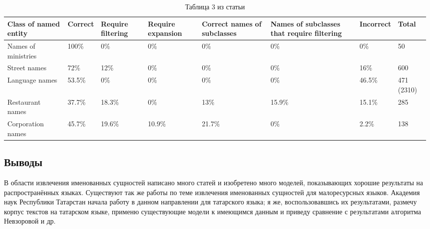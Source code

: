\begin{enumerate}
\end{enumerate}


\begin{table}[h!]
 \begin{tabular}[h]{m{2.2cm}m{1.7cm}m{1.7cm}m{1.8cm}m{1.9cm}m{1.9cm}m{1.7cm}m{1.7cm}}

\hline
\hline
Class of named entity  & Correct & Require filtering & Require expansion & Correct names of subclasses & Names of subclasses that require filtering & Incorrect & Total \\
\hline
 Names of ministries & 100\% & 0\% & 0\% & 0\% & 0\% & 0\% & 50 \\
 \hline
 Street names & 72\% & 12\% & 0\% & 0\% & 0\% & 16\% & 600 \\
 \hline
 Language names & 53.5\% & 0\% & 0\% & 0\% & 0\% & 46.5\% & 471 (2310) \\
 \hline
 Restaurant names & 37.7\% & 18.3\% & 0\% & 13\% & 15.9\% & 15.1\% & 285 \\
 \hline
 Corporation names & 45.7\% & 19.6\% & 10.9\% & 21.7\% & 0\% & 2.2\% & 138 \\
\hline
\hline
\end{tabular}
\caption{Таблица 3 из статьи \cite{Nevzorova}}
\label{table:Nevzorova}
\end{table}

\subsection{Выводы}

В области извлечения именованных сущностей написано много статей и изобретено много моделей, показывающих хорошие результаты на распространённых языках. Существуют так же работы по теме извлечения именованных сущностей для малоресурсных языков. Академия наук Республики Татарстан начала работу в данном направлении для татарского языка; я же, воспользовавшись их результатами, размечу корпус текстов на татарском языке, применю существующие модели к имеющимся данным и приведу сравнение с результатами алгоритма Невзоровой и др.



























